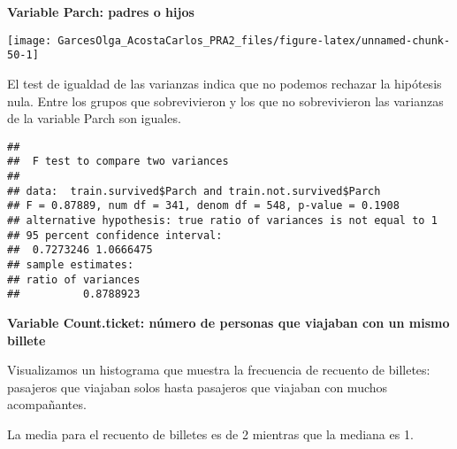 \documentclass[
]{article}
\newenvironment{Shaded}{\begin{snugshade}}{\end{snugshade}}
\newcommand{\KeywordTok}[1]{\textcolor[rgb]{0.94,0.87,0.69}{#1}}
\newcommand{\NormalTok}[1]{\textcolor[rgb]{0.80,0.80,0.80}{#1}}
\newcommand{\OperatorTok}[1]{\textcolor[rgb]{0.94,0.94,0.82}{#1}}
\newcommand{\StringTok}[1]{\textcolor[rgb]{0.80,0.58,0.58}{#1}}
\begin{document}
\textbf{Variable Parch: padres o hijos}

\begin{Shaded}
\end{Shaded}

\begin{center}\texttt{[image: GarcesOlga\_AcostaCarlos\_PRA2\_files/figure-latex/unnamed-chunk-50-1]} \end{center}

El test de igualdad de las varianzas indica que no podemos rechazar la
hipótesis nula. Entre los grupos que sobrevivieron y los que no
sobrevivieron las varianzas de la variable Parch son iguales.

\begin{Shaded}
\end{Shaded}

\begin{verbatim}
## 
##  F test to compare two variances
## 
## data:  train.survived$Parch and train.not.survived$Parch
## F = 0.87889, num df = 341, denom df = 548, p-value = 0.1908
## alternative hypothesis: true ratio of variances is not equal to 1
## 95 percent confidence interval:
##  0.7273246 1.0666475
## sample estimates:
## ratio of variances 
##          0.8788923
\end{verbatim}

\textbf{Variable Count.ticket: número de personas que viajaban con un
mismo billete}

Visualizamos un histograma que muestra la frecuencia de recuento de
billetes: pasajeros que viajaban solos hasta pasajeros que viajaban con
muchos acompañantes.

La media para el recuento de billetes es de 2 mientras que la mediana es
1.

\begin{Shaded}
\end{Shaded}
\end{document}
